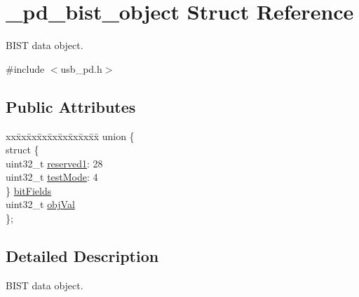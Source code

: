 \hypertarget{struct__pd__bist__object}{\section{\-\_\-pd\-\_\-bist\-\_\-object Struct Reference}
\label{struct__pd__bist__object}
}


B\-I\-S\-T data object.  




{\ttfamily \#include $<$usb\-\_\-pd.\-h$>$}

\subsection*{Public Attributes}
\begin{DoxyCompactItemize}
\item 
\begin{tabbing}
xx\=xx\=xx\=xx\=xx\=xx\=xx\=xx\=xx\=\kill
union \{\\
\>struct \{\\
\>\>uint32\_t \hyperlink{struct__pd__bist__object_ad8bd8067b2567523f31cfa44fffa7171}{reserved1}: 28\\
\>\>uint32\_t \hyperlink{struct__pd__bist__object_a70c61e157a9bafe1d5cb6435212ae557}{testMode}: 4\\
\>\} \hyperlink{struct__pd__bist__object_a849300b1862887c8f556ed20b6e444af}{bitFields}\\
\>uint32\_t \hyperlink{struct__pd__bist__object_a780969d466c2145fb4e91c308f62682d}{objVal}\\
\}; \\

\end{tabbing}\end{DoxyCompactItemize}


\subsection{Detailed Description}
B\-I\-S\-T data object. 

